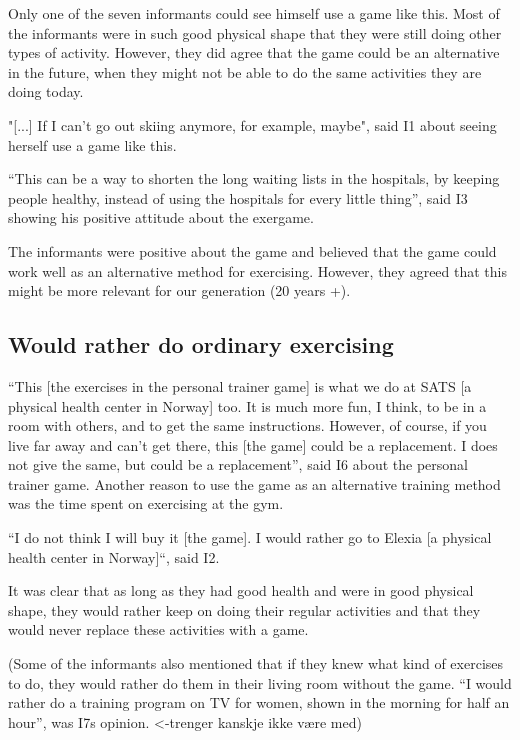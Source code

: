 Only one of the seven informants could see himself use a game like this. Most of the informants were in such good physical shape that they were still doing other types of activity. However, they did agree that the game could be an alternative in the future, when they might not be able to do the same activities they are doing today. 

"[...] If I can't go out skiing anymore, for example, maybe", said I1 about seeing herself use a game like this. 

“This can be a way to shorten the long waiting lists in the hospitals, by keeping people healthy, instead of using the hospitals for every little thing”, said I3 showing his positive attitude about the exergame. 

The informants were positive about the game and believed that the game could work well as an alternative method for exercising. However, they agreed that this might be more relevant for our generation (20 years +). 

\subsection{Would rather do ordinary exercising}
“This [the exercises in the personal trainer game] is what we do at SATS [a physical health center in Norway] too. It is much more fun, I think, to be in a room with others, and to get the same instructions. However, of course, if you live far away and can't get there, this [the game] could be a replacement. I does not give the same, but could be a replacement”, said I6 about the personal trainer game. Another reason to use the game as an alternative training method was the time spent on exercising at the gym.

“I do not think I will buy it [the game]. I would rather go to Elexia [a physical health center in Norway]“, said I2.

It was clear that as long as they had good health and were in good physical shape, they would rather keep on doing their regular activities and that they would never replace these activities with a game. 

(Some of the informants also mentioned that if they knew what kind of exercises to do, they would rather do them in their living room without the game. 
“I would rather do a training program on TV for women, shown in the morning for half an hour”, was I7s opinion. <-trenger kanskje ikke være med)


